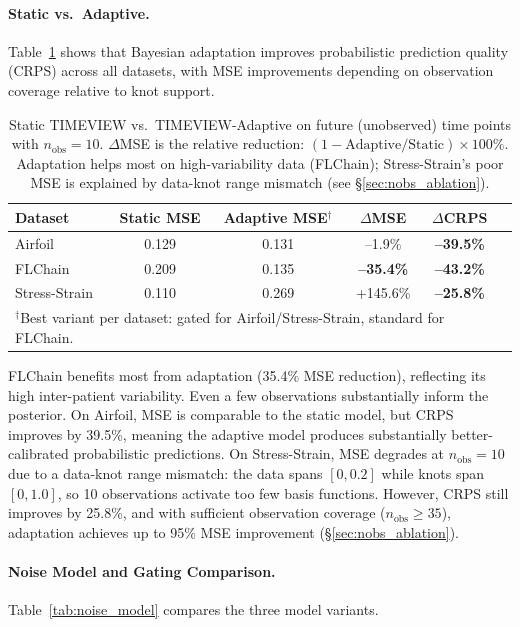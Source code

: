 \documentclass[final]{article}
\begin{document}
\paragraph{Static vs.\ Adaptive.} Table~\ref{tab:main} shows that Bayesian adaptation improves probabilistic prediction quality (CRPS) across all datasets, with MSE improvements depending on observation coverage relative to knot support.

\begin{table}[t]
\caption{Static TIMEVIEW vs.\ TIMEVIEW-Adaptive on future (unobserved) time points with $n_{\mathrm{obs}}=10$. $\Delta$MSE is the relative reduction: $(1 - \text{Adaptive}/\text{Static}) \times 100\%$. Adaptation helps most on high-variability data (FLChain); Stress-Strain's poor MSE is explained by data-knot range mismatch (see \S\ref{sec:nobs_ablation}).}
\label{tab:main}
\centering
\small
\begin{tabular}{lccccc}
\toprule
Dataset & Static MSE & Adaptive MSE$^\dagger$ & $\Delta$MSE & $\Delta$CRPS \\
\midrule
Airfoil & 0.129 & 0.131 & --1.9\% & \textbf{--39.5\%} \\
FLChain & 0.209 & 0.135 & \textbf{--35.4\%} & \textbf{--43.2\%} \\
Stress-Strain & 0.110 & 0.269 & +145.6\% & \textbf{--25.8\%} \\
\bottomrule
\multicolumn{5}{l}{\footnotesize $^\dagger$Best variant per dataset: gated for Airfoil/Stress-Strain, standard for FLChain.}
\end{tabular}
\end{table}

FLChain benefits most from adaptation (35.4\% MSE reduction), reflecting its high inter-patient variability. Even a few observations substantially inform the posterior. On Airfoil, MSE is comparable to the static model, but CRPS improves by 39.5\%, meaning the adaptive model produces substantially better-calibrated probabilistic predictions. On Stress-Strain, MSE degrades at $n_{\mathrm{obs}}=10$ due to a data-knot range mismatch: the data spans $[0, 0.2]$ while knots span $[0, 1.0]$, so 10 observations activate too few basis functions. However, CRPS still improves by 25.8\%, and with sufficient observation coverage ($n_{\mathrm{obs}} \geq 35$), adaptation achieves up to 95\% MSE improvement (\S\ref{sec:nobs_ablation}).

\paragraph{Noise Model and Gating Comparison.} Table~\ref{tab:noise_model} compares the three model variants.
\end{document}
